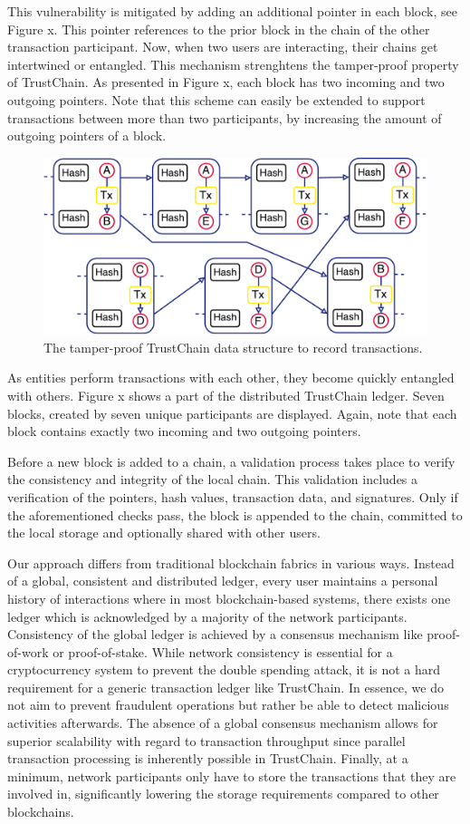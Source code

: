 \documentclass[USenglish]{article}
\begin{document}
This vulnerability is mitigated by adding an additional pointer in each block, see Figure x.
This pointer references to the prior block in the chain of the other transaction participant.
Now, when two users are interacting, their chains get intertwined or entangled.
This mechanism strenghtens the tamper-proof property of TrustChain.
As presented in Figure x, each block has two incoming and two outgoing pointers.
Note that this scheme can easily be extended to support transactions between more than two participants, by increasing the amount of outgoing pointers of a block.

\begin{figure}[h!]
	\centering
	\includegraphics[width=0.8\columnwidth]{assets/trustchain}
	\caption{The tamper-proof TrustChain data structure to record transactions.}
	\label{fig:trustchain}
\end{figure}

As entities perform transactions with each other, they become quickly entangled with others.
Figure x shows a part of the distributed TrustChain ledger.
Seven blocks, created by seven unique participants are displayed.
Again, note that each block contains exactly two incoming and two outgoing pointers.

Before a new block is added to a chain, a validation process takes place to verify the consistency and integrity of the local chain.
This validation includes a verification of the pointers, hash values, transaction data, and signatures.
Only if the aforementioned checks pass, the block is appended to the chain, committed to the local storage and optionally shared with other users.

Our approach differs from traditional blockchain fabrics in various ways.
Instead of a global, consistent and distributed ledger, every user maintains a personal history of interactions where in most blockchain-based systems, there exists one ledger which is acknowledged by a majority of the network participants.
Consistency of the global ledger is achieved by a consensus mechanism like proof-of-work or proof-of-stake.
While network consistency is essential for a cryptocurrency system to prevent the double spending attack, it is not a hard requirement for a generic transaction ledger like TrustChain.
In essence, we do not aim to prevent fraudulent operations but rather be able to detect malicious activities afterwards.
The absence of a global consensus mechanism allows for superior scalability with regard to transaction throughput since parallel transaction processing is inherently possible in TrustChain.
Finally, at a minimum, network participants only have to store the transactions that they are involved in, significantly lowering the storage requirements compared to other blockchains.
\end{document}
